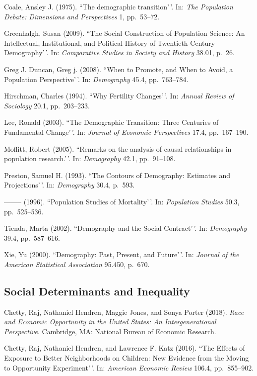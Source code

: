 \documentclass[11pt,]{article}
\begin{document}
Coale, Ansley J. (1975). ``The demographic transition'\,'. In:
\emph{The Population Debate: Dimensions and Perspectives} 1, pp.~53--72.

Greenhalgh, Susan (2009). ``The Social Construction of Population
Science: An Intellectual, Institutional, and Political History of
Twentieth-Century Demography'\,'. In:
\emph{Comparative Studies in Society and History} 38.01, p.~26.

Greg J. Duncan, Greg j. (2008). ``When to Promote, and When to Avoid, a
Population Perspective'\,'. In: \emph{Demography} 45.4, pp.~763--784.

Hirschman, Charles (1994). ``Why Fertility Changes'\,'. In:
\emph{Annual Review of Sociology} 20.1, pp.~203--233.

Lee, Ronald (2003). ``The Demographic Transition: Three Centuries of
Fundamental Change'\,'. In: \emph{Journal of Economic Perspectives}
17.4, pp.~167--190.

Moffitt, Robert (2005). ``Remarks on the analysis of causal
relationships in population research.'\,'. In: \emph{Demography} 42.1,
pp.~91--108.

Preston, Samuel H. (1993). ``The Contours of Demography: Estimates and
Projections'\,'. In: \emph{Demography} 30.4, p.~593.

-------- (1996). ``Population Studies of Mortality'\,'. In:
\emph{Population Studies} 50.3, pp.~525--536.

Tienda, Marta (2002). ``Demography and the Social Contract'\,'. In:
\emph{Demography} 39.4, pp.~587--616.

Xie, Yu (2000). ``Demography: Past, Present, and Future'\,'. In:
\emph{Journal of the American Statistical Association} 95.450, p.~670.

\hypertarget{social-determinants-and-inequality}{%
\subsection{Social Determinants and
Inequality}\label{social-determinants-and-inequality}}

Chetty, Raj, Nathaniel Hendren, Maggie Jones, and Sonya Porter (2018).
\emph{Race and Economic Opportunity in the United States: An Intergenerational Perspective}.
Cambridge, MA: National Bureau of Economic Research.

Chetty, Raj, Nathaniel Hendren, and Lawrence F. Katz (2016). ``The
Effects of Exposure to Better Neighborhoods on Children: New Evidence
from the Moving to Opportunity Experiment'\,'. In:
\emph{American Economic Review} 106.4, pp.~855--902.
\end{document}
